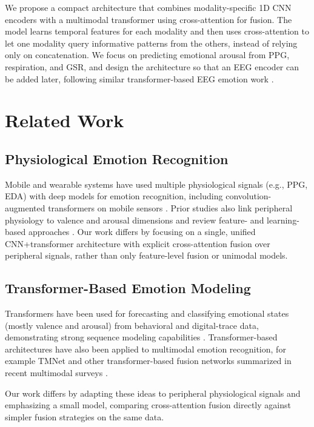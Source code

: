 \documentclass[conference]{IEEEtran}
\begin{document}
We propose a compact architecture that combines modality-specific 1D CNN encoders with a multimodal transformer using cross-attention for fusion. The model learns temporal features for each modality and then uses cross-attention to let one modality query informative patterns from the others, instead of relying only on concatenation. We focus on predicting emotional arousal from PPG, respiration, and GSR, and design the architecture so that an EEG encoder can be added later, following similar transformer-based EEG emotion work \cite{li_spatial_2025,abgeena_unravelling_2025}.

\section{Related Work}
\subsection{Physiological Emotion Recognition}
Mobile and wearable systems have used multiple physiological signals (e.g., PPG, EDA) with deep models for emotion recognition, including convolution-augmented transformers on mobile sensors \cite{yang_mobile_2022}. Prior studies also link peripheral physiology to valence and arousal dimensions and review feature- and learning-based approaches \cite{sato_physiological_2020,kacimi_comprehensive_2025}. Our work differs by focusing on a single, unified CNN+transformer architecture with explicit cross-attention fusion over peripheral signals, rather than only feature-level fusion or unimodal models.

\subsection{Transformer-Based Emotion Modeling}
Transformers have been used for forecasting and classifying emotional states (mostly valence and arousal) from behavioral and digital-trace data, demonstrating strong sequence modeling capabilities \cite{paz-arbaizar_emotion_2025,noauthor_emotion_2025}. Transformer-based architectures have also been applied to multimodal emotion recognition, for example TMNet \cite{alam_tmnet_2025} and other transformer-based fusion networks summarized in recent multimodal surveys \cite{wu_comprehensive_2025,abdurahmon_general_2025}.

Our work differs by adapting these ideas to peripheral physiological signals and emphasizing a small model, comparing cross-attention fusion directly against simpler fusion strategies on the same data.
\end{document}
